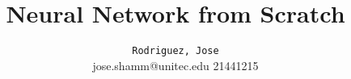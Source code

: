 \title{Neural Network from Scratch}
\author{
	\texttt{Rodriguez, Jose\\}
	jose.shamm@unitec.edu 21441215
}


\maketitle
\tableofcontents
\newpage
